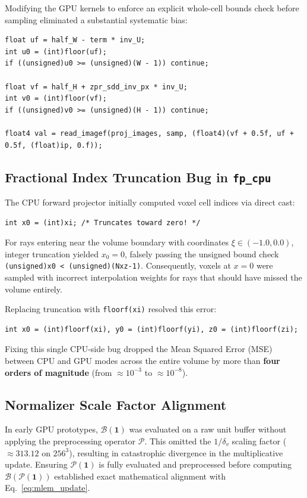 \documentclass[11pt,a4paper]{article}
\begin{document}
Modifying the GPU kernels to enforce an explicit whole-cell bounds check before sampling eliminated a substantial systematic bias:
\begin{lstlisting}
float uf = half_W - term * inv_U;
int u0 = (int)floor(uf);
if ((unsigned)u0 >= (unsigned)(W - 1)) continue;

float vf = half_H + zpr_sdd_inv_px * inv_U;
int v0 = (int)floor(vf);
if ((unsigned)v0 >= (unsigned)(H - 1)) continue;

float4 val = read_imagef(proj_images, samp, (float4)(vf + 0.5f, uf + 0.5f, (float)ip, 0.f));
\end{lstlisting}

\subsection{Fractional Index Truncation Bug in \texttt{fp\_cpu}}
The CPU forward projector initially computed voxel cell indices via direct cast:
\begin{lstlisting}
int x0 = (int)xi; /* Truncates toward zero! */
\end{lstlisting}
For rays entering near the volume boundary with coordinates $\xi \in (-1.0, 0.0)$, integer truncation yielded $x_0 = 0$, falsely passing the unsigned bound check \texttt{(unsigned)x0 < (unsigned)(Nxz-1)}. Consequently, voxels at $x=0$ were sampled with incorrect interpolation weights for rays that should have missed the volume entirely.

Replacing truncation with \texttt{floorf(xi)} resolved this error:
\begin{lstlisting}
int x0 = (int)floorf(xi), y0 = (int)floorf(yi), z0 = (int)floorf(zi);
\end{lstlisting}
Fixing this single CPU-side bug dropped the Mean Squared Error (MSE) between CPU and GPU modes across the entire volume by more than \textbf{four orders of magnitude} (from $\approx 10^{-3}$ to $\approx 10^{-8}$).

\subsection{Normalizer Scale Factor Alignment}
In early GPU prototypes, $\mathcal{B}(\mathbf{1})$ was evaluated on a raw unit buffer without applying the preprocessing operator $\mathcal{P}$. This omitted the $1/\delta_v$ scaling factor ($\approx 313.12$ on $256^3$), resulting in catastrophic divergence in the multiplicative update. Ensuring $\mathcal{P}(\mathbf{1})$ is fully evaluated and preprocessed before computing $\mathcal{B}(\mathcal{P}(\mathbf{1}))$ established exact mathematical alignment with Eq.~\eqref{eq:mlem_update}.
\end{document}
